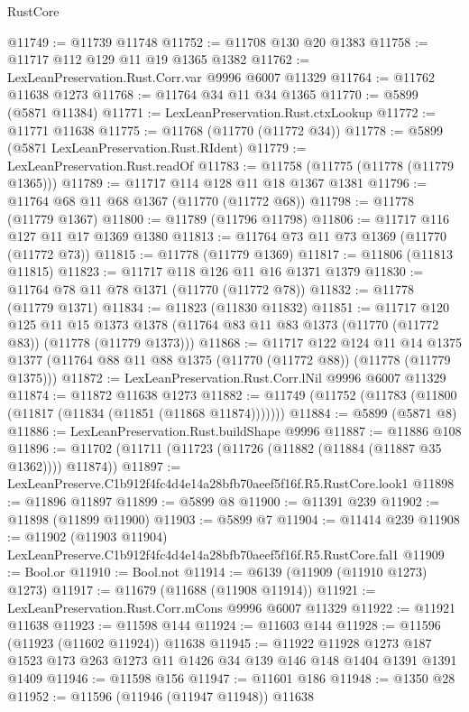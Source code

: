 \begin{lexlean}{RustCore}
\begin{coremodule}
@11749 := @11739 @11748
@11752 := @11708 @130 @20 @1383
@11758 := @11717 @112 @129 @11 @19 @1365 @1382
@11762 := LexLeanPreservation.Rust.Corr.var @9996 @6007 @11329
@11764 := @11762 @11638 @1273
@11768 := @11764 @34 @11 @34 @1365
@11770 := @5899 (@5871 @11384)
@11771 := LexLeanPreservation.Rust.ctxLookup
@11772 := @11771 @11638
@11775 := @11768 (@11770 (@11772 @34))
@11778 := @5899 (@5871 LexLeanPreservation.Rust.RIdent)
@11779 := LexLeanPreservation.Rust.readOf
@11783 := @11758 (@11775 (@11778 (@11779 @1365)))
@11789 := @11717 @114 @128 @11 @18 @1367 @1381
@11796 := @11764 @68 @11 @68 @1367 (@11770 (@11772 @68))
@11798 := @11778 (@11779 @1367)
@11800 := @11789 (@11796 @11798)
@11806 := @11717 @116 @127 @11 @17 @1369 @1380
@11813 := @11764 @73 @11 @73 @1369 (@11770 (@11772 @73))
@11815 := @11778 (@11779 @1369)
@11817 := @11806 (@11813 @11815)
@11823 := @11717 @118 @126 @11 @16 @1371 @1379
@11830 := @11764 @78 @11 @78 @1371 (@11770 (@11772 @78))
@11832 := @11778 (@11779 @1371)
@11834 := @11823 (@11830 @11832)
@11851 := @11717
    @120
    @125
    @11
    @15
    @1373
    @1378
    (@11764 @83 @11 @83 @1373 (@11770 (@11772 @83)) (@11778 (@11779 @1373)))
@11868 := @11717
    @122
    @124
    @11
    @14
    @1375
    @1377
    (@11764 @88 @11 @88 @1375 (@11770 (@11772 @88)) (@11778 (@11779 @1375)))
@11872 := LexLeanPreservation.Rust.Corr.lNil @9996 @6007 @11329
@11874 := @11872 @11638 @1273
@11882 := @11749 (@11752 (@11783 (@11800 (@11817 (@11834 (@11851 (@11868 @11874)))))))
@11884 := @5899 (@5871 @8)
@11886 := LexLeanPreservation.Rust.buildShape @9996
@11887 := @11886 @108
@11896 := @11702 (@11711 (@11723 (@11726 (@11882 (@11884 (@11887 @35 @1362)))) @11874))
@11897 := LexLeanPreserve.C1b912f4fc4d4e14a28bfb70aeef5f16f.R5.RustCore.look1
@11898 := @11896 @11897
@11899 := @5899 @8
@11900 := @11391 @239
@11902 := @11898 (@11899 @11900)
@11903 := @5899 @7
@11904 := @11414 @239
@11908 := @11902 (@11903 @11904) LexLeanPreserve.C1b912f4fc4d4e14a28bfb70aeef5f16f.R5.RustCore.fal1
@11909 := Bool.or
@11910 := Bool.not
@11914 := @6139 (@11909 (@11910 @1273) @1273)
@11917 := @11679 (@11688 (@11908 @11914))
@11921 := LexLeanPreservation.Rust.Corr.mCons @9996 @6007 @11329
@11922 := @11921 @11638
@11923 := @11598 @144
@11924 := @11603 @144
@11928 := @11596 (@11923 (@11602 @11924)) @11638
@11945 := @11922
    @11928
    @1273
    @187
    @1523
    @173
    @263
    @1273
    @11
    @1426
    @34
    @139
    @146
    @148
    @1404
    @1391
    @1391
    @1409
@11946 := @11598 @156
@11947 := @11601 @186
@11948 := @1350 @28
@11952 := @11596 (@11946 (@11947 @11948)) @11638

\end{coremodule}
\end{lexlean}
